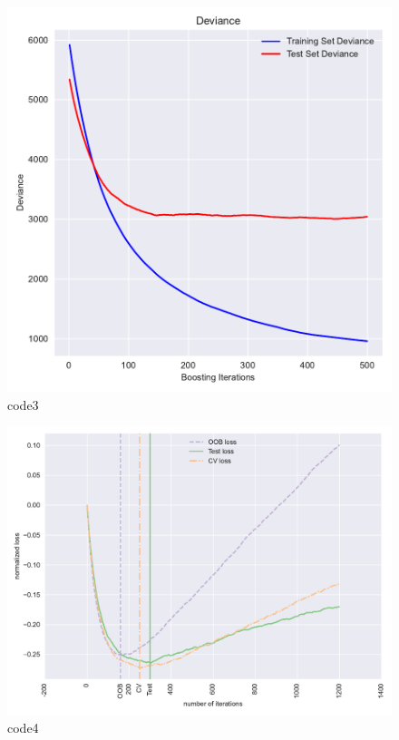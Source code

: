 \begin{figure}[htbp]
	\centering
	\includegraphics[width=14cm]{codeimage/code3}
	\caption{code3}
	\label{code3}
\end{figure}

\begin{PythonCode}\label{例4}
	
\end{PythonCode}

\begin{figure}[htbp]
	\centering
	\includegraphics[width=14cm]{codeimage/code4}
	\caption{code4}
	\label{code4}
\end{figure}

